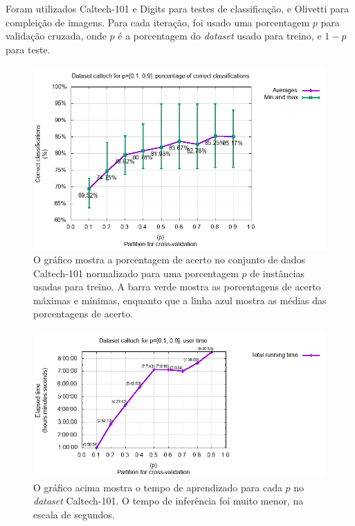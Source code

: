 \documentclass[12pt]{article}
\theoremstyle{plain}
\numberwithin{equation}{section}
\begin{document}
Foram utilizados Caltech-101 e Digits para testes de classificação, e Olivetti para compleição de
imagens. Para cada iteração, foi usado uma porcentagem $p$ para validação cruzada, onde $p$ é a
porcentagem do \textit{dataset} usado para treino, e $1-p$ para teste.

\begin{figure}[h]
  \centering\includegraphics[scale=0.75]{imgs/caltech_percs.png}
  \captionsetup{justification=raggedright}
  \caption{O gráfico mostra a porcentagem de acerto no conjunto de dados Caltech-101 normalizado
  para uma porcentagem $p$ de instâncias usadas para treino. A barra verde mostra as porcentagens
  de acerto máximas e mínimas, enquanto que a linha azul mostra as médias das porcentagens de
  acerto.}
\end{figure}

\begin{figure}[H]
  \centering\includegraphics[scale=0.75]{imgs/caltech_time.png}
  \captionsetup{justification=raggedright}
  \caption{O gráfico acima mostra o tempo de aprendizado para cada $p$ no \textit{dataset}
  Caltech-101. O tempo de inferência foi muito menor, na escala de segundos.}
\end{figure}
\end{document}
